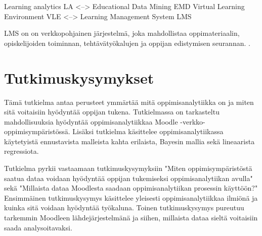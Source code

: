 Learning analytics LA <--> Educational Data Mining EMD \citep{romeroEducationalDataMining2010}
Virtual Learning Environment VLE <--> Learning Management System LMS

LMS on on verkkopohjainen järjestelmä, joka mahdollistaa oppimateriaalin, opiskelijoiden toiminnan, tehtävätyökalujen ja oppijan edistymisen seurannan. \citep{mohdChoosingRightLearning2016}. \citep{romeroSurveyPreProcessingEducational2014}
\color{black}

\section{Tutkimuskysymykset}
Tämä tutkielma antaa perusteet ymmärtää mitä oppimisanalytiikka on ja miten sitä voitaisiin hyödyntää oppijan tukena. Tutkielmassa on tarkasteltu mahdollisuuksia hyödyntää oppimisanalytiikkaa Moodle -verkko-oppimisympäristössä. Lisäksi tutkielma käsittelee oppimisanalytiikassa käytetyistä ennustavista malleista kahta erilaista, Bayesin mallia sekä lineaarista regressiota.

Tutkielma pyrkii vastaamaan tutkimuskysymyksiin "Miten oppimisympäristöstä saatua dataa voidaan hyödyntää oppijan tukemiseksi oppimisanalytiikan avulla" sekä "Millaista dataa Moodlesta saadaan oppimisanalytiikan prosessin käyttöön?" Ensimmäinen tutkimuskysymys käsittelee yleisesti oppimisanalytiikkaa ilmiönä ja kuinka sitä voidaan hyödyntää työkaluna. Toinen tutkimuskysymys pureutuu tarkemmin Moodleen lähdejärjestelmänä ja siihen, millaista dataa sieltä voitaisiin saada analysoitavaksi.

